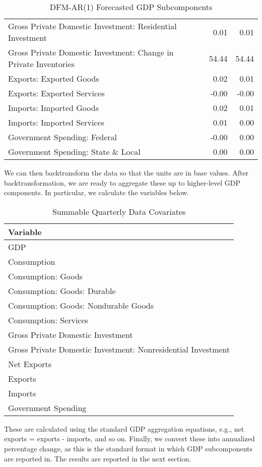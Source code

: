 \documentclass[11pt, letterpaper]{article}\usepackage[]{graphicx}\usepackage[]{color}
\begin{document}
\begin{table}[H]
\begin{tabular}{lrr}
  Gross Private Domestic Investment: Residential Investment & 0.01 & 0.01 \\ 
  Gross Private Domestic Investment: Change in Private Inventories & 54.44 & 54.44 \\ 
  Exports: Exported Goods & 0.02 & 0.01 \\ 
  Exports: Exported Services & -0.00 & -0.00 \\ 
  Imports: Imported Goods & 0.02 & 0.01 \\ 
  Imports: Imported Services & 0.01 & 0.00 \\ 
  Government Spending: Federal & -0.00 & 0.00 \\ 
  Government Spending: State \& Local & 0.00 & 0.00 \\ 
   \hline
\end{tabular}
\endgroup
\caption{DFM-AR(1) Forecasted GDP Subcomponents} 
\end{table}


We can then backtransform the data so that the units are in base values. After backtransformation, we are ready to aggregate these up to higher-level GDP components. In particular, we calculate the variables below.
\begin{table}[H]
\centering
\begingroup\scriptsize
\begin{tabular}{l}
  \hline
Variable \\ 
  \hline
GDP \\ 
  Consumption \\ 
  Consumption: Goods \\ 
  Consumption: Goods: Durable \\ 
  Consumption: Goods: Nondurable Goods \\ 
  Consumption: Services \\ 
  Gross Private Domestic Investment \\ 
  Gross Private Domestic Investment: Nonresidential Investment \\ 
  Net Exports \\ 
  Exports \\ 
  Imports \\ 
  Government Spending \\ 
   \hline
\end{tabular}
\endgroup
\caption{Summable Quarterly Data Covariates} 
\end{table}

These are calculated using the standard GDP aggregation equations, e.g., net exports = exports - imports, and so on.
Finally, we convert these into annualized percentage change, as this is the standard format in which GDP subcomponents are reported in. The results are reported in the next section.
\end{document}
